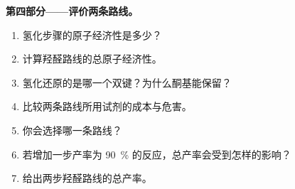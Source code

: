 \begin{problem}
\medskip
\noindent\textbf{第四部分——评价两条路线。}
\begin{enumerate}[resume]
  \item 氢化步骤的原子经济性是多少？
  \item 计算羟醛路线的总原子经济性。
  \item 氢化还原的是哪一个双键？为什么酮基能保留？
  \item 比较两条路线所用试剂的成本与危害。
  \item 你会选择哪一条路线？
  \item 若增加一步产率为 90~\% 的反应，总产率会受到怎样的影响？
  \item 给出两步羟醛路线的总产率。
\end{enumerate}
\end{problem}
